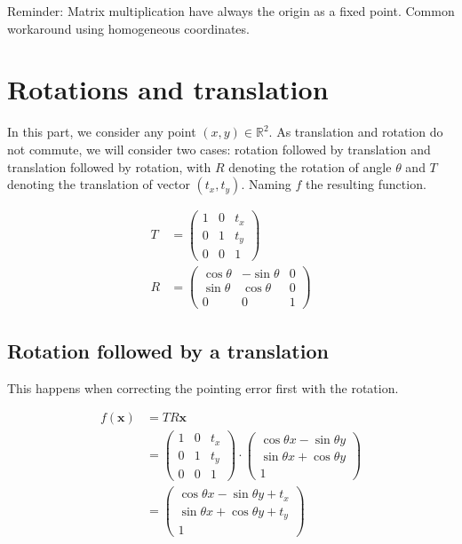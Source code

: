 \documentclass[paper=a4, fontsize=11pt]{article}
\begin{document}
\appendix

Reminder: Matrix multiplication have always the origin as a fixed point. Common workaround using homogeneous coordinates.

\section{Rotations and translation}

In this part, we consider any point \((x, y) \in \mathbb{R}^2\). As translation and rotation do not commute, we will consider two cases: rotation followed by translation and translation followed by rotation, with \(R\) denoting the rotation of angle \(\theta\) and \(T\) denoting the translation of vector \((t_x, t_y)\). Naming \(f\) the resulting function.

\begin{align*}
	T &=
		\begin{pmatrix}
			1 & 0 & t_x \\
			0 & 1 & t_y \\
			0 & 0 & 1
		\end{pmatrix}
		\\
	R &=
		\begin{pmatrix}
			\cos \theta & -\sin \theta & 0 \\
			\sin \theta & \cos \theta & 0 \\
			0 & 0 & 1
		\end{pmatrix}
\end{align*}


\subsection{Rotation followed by a translation}
This happens when correcting the pointing error first with the rotation.

\begin{align*}
	f(\bm{x}) &= TR\bm{x} \\
	&=
		\begin{pmatrix}
			1 & 0 & t_x \\
			0 & 1 & t_y \\
			0 & 0 & 1
		\end{pmatrix}
		\cdot
		\begin{pmatrix}
			\cos \theta x - \sin \theta y \\
			\sin \theta x + \cos \theta y \\
			1
		\end{pmatrix}
		\\
	&=
		\begin{pmatrix}
			\cos \theta x - \sin \theta y + t_x\\
			\sin \theta x + \cos \theta y + t_y\\
			1
		\end{pmatrix}
\end{align*}
\end{document}
